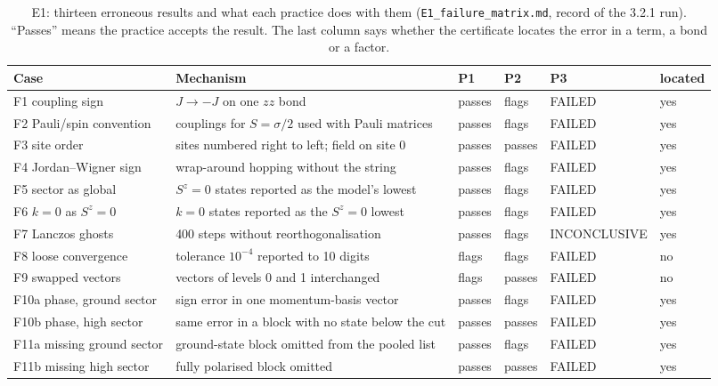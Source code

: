 \documentclass[11pt,a4paper]{article}
\newcommand{\code}[1]{\texttt{#1}}
\newcommand{\status}[1]{\textsf{#1}}
\newcommand{\FAIL}{\status{FAILED}}
\newcommand{\INC}{\status{INCONCLUSIVE}}
\begin{document}
\begin{table}[ht]
\centering\small
\caption{E1: thirteen erroneous results and what each practice does with them (\code{E1\_failure\_matrix.md}, record of
the 3.2.1 run). ``Passes'' means the practice accepts the result. The last column says whether the certificate locates
the error in a term, a bond or a factor.}
\label{tab:e1}
\begin{tabular}{@{}p{3.6cm}p{4.3cm}llll@{}}
\toprule
Case & Mechanism & P1 & P2 & P3 & located \\
\midrule
F1 coupling sign & $J\to-J$ on one $zz$ bond & passes & flags & \FAIL & yes \\
F2 Pauli/spin convention & couplings for $S=\sigma/2$ used with Pauli matrices & passes & flags & \FAIL & yes \\
F3 site order & sites numbered right to left; field on site 0 & passes & passes & \FAIL & yes \\
F4 Jordan--Wigner sign & wrap-around hopping without the string & passes & flags & \FAIL & yes \\
F5 sector as global & $S^z=0$ states reported as the model's lowest & passes & flags & \FAIL & yes \\
F6 $k=0$ as $S^z=0$ & $k=0$ states reported as the $S^z=0$ lowest & passes & flags & \FAIL & yes \\
F7 Lanczos ghosts & 400 steps without reorthogonalisation & passes & flags & \INC & yes \\
F8 loose convergence & tolerance $10^{-4}$ reported to 10 digits & flags & flags & \FAIL & no \\
F9 swapped vectors & vectors of levels 0 and 1 interchanged & flags & passes & \FAIL & no \\
F10a phase, ground sector & sign error in one momentum-basis vector & passes & flags & \FAIL & yes \\
F10b phase, high sector & same error in a block with no state below the cut & passes & passes & \FAIL & yes \\
F11a missing ground sector & ground-state block omitted from the pooled list & passes & flags & \FAIL & yes \\
F11b missing high sector & fully polarised block omitted & passes & passes & \FAIL & yes \\
\bottomrule
\end{tabular}
\end{table}
\end{document}
